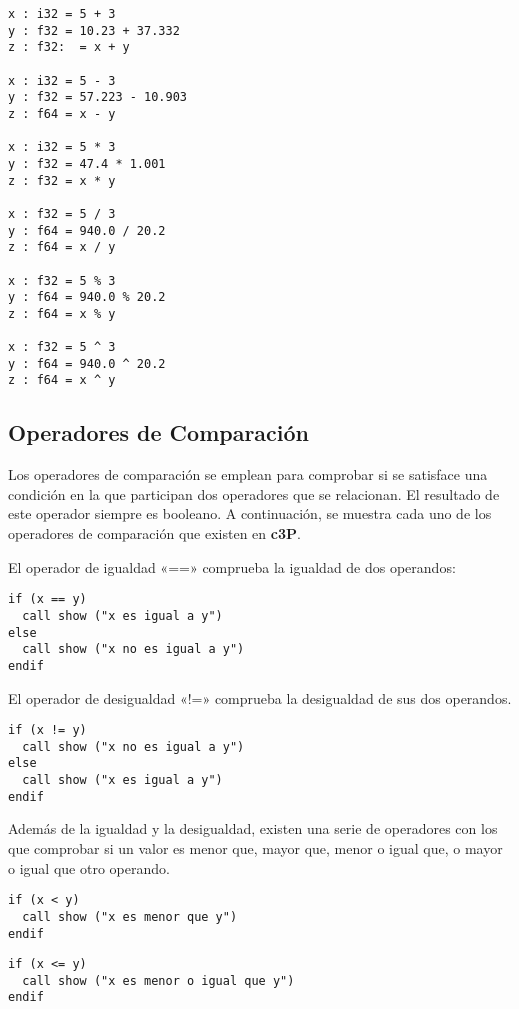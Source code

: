 \begin{verbatim}
x : i32 = 5 + 3
y : f32 = 10.23 + 37.332
z : f32:  = x + y

x : i32 = 5 - 3
y : f32 = 57.223 - 10.903
z : f64 = x - y

x : i32 = 5 * 3
y : f32 = 47.4 * 1.001
z : f32 = x * y

x : f32 = 5 / 3
y : f64 = 940.0 / 20.2
z : f64 = x / y

x : f32 = 5 % 3
y : f64 = 940.0 % 20.2
z : f64 = x % y

x : f32 = 5 ^ 3
y : f64 = 940.0 ^ 20.2
z : f64 = x ^ y
\end{verbatim}

\subsection{Operadores de Comparación}

Los operadores de comparación se emplean para comprobar si se satisface una condición
en la que participan dos operadores que se relacionan. El resultado de este operador
siempre es booleano. A continuación, se muestra cada uno de los operadores de comparación
que existen en \textbf{c3P}.

El operador de igualdad «==» comprueba la igualdad de dos operandos:

\begin{verbatim}
if (x == y)
  call show ("x es igual a y")
else
  call show ("x no es igual a y")
endif
\end{verbatim}

El operador de desigualdad «!=» comprueba la desigualdad de sus dos operandos.

\begin{verbatim}
if (x != y)
  call show ("x no es igual a y")
else
  call show ("x es igual a y")
endif
\end{verbatim}

Además de la igualdad y la desigualdad, existen una serie de operadores con los que
comprobar si un valor es menor que, mayor que, menor o igual que, o mayor o igual
que otro operando.

\begin{verbatim}
if (x < y)
  call show ("x es menor que y")
endif
\end{verbatim}

\begin{verbatim}
if (x <= y)
  call show ("x es menor o igual que y")
endif
\end{verbatim}

